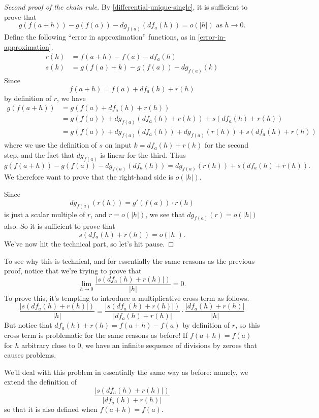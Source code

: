 \begin{proof}[Second proof of the chain rule] \renewcommand{\qedsymbol}{}
	By \cref{differential-unique-single}, it is sufficient to prove that
	\[ g(f(a+h))-g(f(a))-dg_{f(a)}(df_a(h)) = o(|h|) \text{ as } h \to 0. \]
	Define the following ``error in approximation'' functions, as in \cref{error-in-approximation}. 
	\[ \begin{aligned} 
	r(h) &= f(a+h)-f(a) - df_a(h) \\ 
	s(k) &= g(f(a)+k)-g(f(a))-dg_{f(a)}(k) \end{aligned} \]
	Since
	\[ f(a+h) = f(a) + df_a(h) + r(h) \]
	by definition of $r$, we have
	\[ \begin{aligned}
	g(f(a+h)) &= g(f(a) + df_a(h) + r(h)) \\
	&= g(f(a)) + dg_{f(a)}(df_{a}(h) + r(h)) + s(df_a(h)+r(h)) \\
	&= g(f(a)) + dg_{f(a)}(df_{a}(h)) + dg_{f(a)}(r(h)) +  s(df_a(h) + r(h)) \end{aligned} \]
	where we use the definition of $s$ on input $k = df_a(h)+r(h)$ for the second step, and the fact that $dg_{f(a)}$ is linear for the third. Thus
	\[ g(f(a+h)) - g(f(a)) - dg_{f(a)}(df_a(h)) = dg_{f(a)}(r(h)) + s(df_a(h)+r(h)). \]
	We therefore want to prove that the right-hand side is $o(|h|)$. 	
	
	Since \[ dg_{f(a)}(r(h)) = g'(f(a)) \cdot r(h) \] is just a scalar multiple of $r$, and $r = o(|h|)$, we see that $dg_{f(a)}(r) = o(|h|)$ also. So it is sufficient to prove that
	\[ s(df_a(h)+r(h)) = o(|h|). \]
	We've now hit the technical part, so let's hit pause. 
\end{proof}

To see why this is technical, and for essentially the same reasons as the previous proof, notice that we're trying to prove that
\[ \lim_{h \to 0} \frac{|s(df_a(h)+r(h)|)}{|h|} = 0.  \]
To prove this, it's tempting to introduce a multiplicative cross-term as follows. 
\[ \frac{|s(df_a(h)+r(h)|)}{|h|} = \frac{|s(df_a(h)+r(h)|)}{|df_a(h)+r(h)|} \cdot \frac{|df_a(h)+r(h)|}{|h|} \]
But notice that $df_a(h)+r(h) = f(a+h)-f(a)$ by definition of $r$, so this cross term is problematic for the same reasons as before! If $f(a+h) = f(a)$ for $h$ arbitrary close to $0$, we have an infinite sequence of divisions by zeroes that causes problems. 

We'll deal with this problem in essentially the same way as before: namely, we extend the definition of 
\[\frac{|s(df_a(h)+r(h)|)}{|df_a(h)+r(h)|}\]
so that it is also defined when $f(a+h) = f(a)$. 

